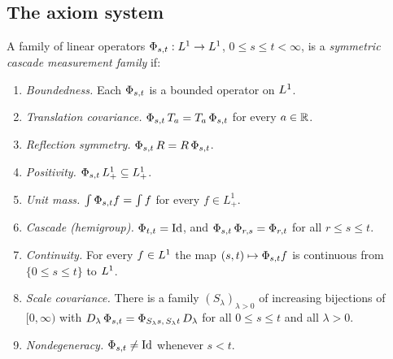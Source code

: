 \subsection{The axiom system}\label{sec:axioms-system}

\begin{definition}\label{def:cascade-family}
A family of linear operators $\Phi_{s,t} : L^1 \to L^1$, $0 \le s \le t < \infty$, is a
\emph{symmetric cascade measurement family} if:
\begin{enumerate}
\item[(A1)] \emph{Boundedness.} Each $\Phi_{s,t}$ is a bounded operator on $L^1$.
\item[(A2)] \emph{Translation covariance.} $\Phi_{s,t}\,T_{a} = T_{a}\,\Phi_{s,t}$ for
every $a \in \mathbb{R}$.
\item[(A3)] \emph{Reflection symmetry.} $\Phi_{s,t}\,R = R\,\Phi_{s,t}$.
\item[(A4)] \emph{Positivity.} $\Phi_{s,t}\,L^1_+ \subseteq L^1_+$.
\item[(A5)] \emph{Unit mass.} $\int \Phi_{s,t} f = \int f$ for every $f \in L^1_+$.
\item[(A6)] \emph{Cascade (hemigroup).} $\Phi_{t,t} = \mathrm{Id}$, and
$\Phi_{s,t}\,\Phi_{r,s} = \Phi_{r,t}$ for all $r \le s \le t$.
\item[(A7)] \emph{Continuity.} For every $f \in L^1$ the map $(s,t) \mapsto \Phi_{s,t}f$ is
continuous from $\{0 \le s \le t\}$ to $L^1$.
\item[(A8)] \emph{Scale covariance.} There is a family $(S_\lambda)_{\lambda > 0}$ of
increasing bijections of $[0,\infty)$ with
$D_{\lambda}\,\Phi_{s,t} = \Phi_{S_\lambda s,\,S_\lambda t}\,D_{\lambda}$ for all
$0 \le s \le t$ and all $\lambda > 0$.
\item[(ND)] \emph{Nondegeneracy.} $\Phi_{s,t} \ne \mathrm{Id}$ whenever $s < t$.
\end{enumerate}
\end{definition}

